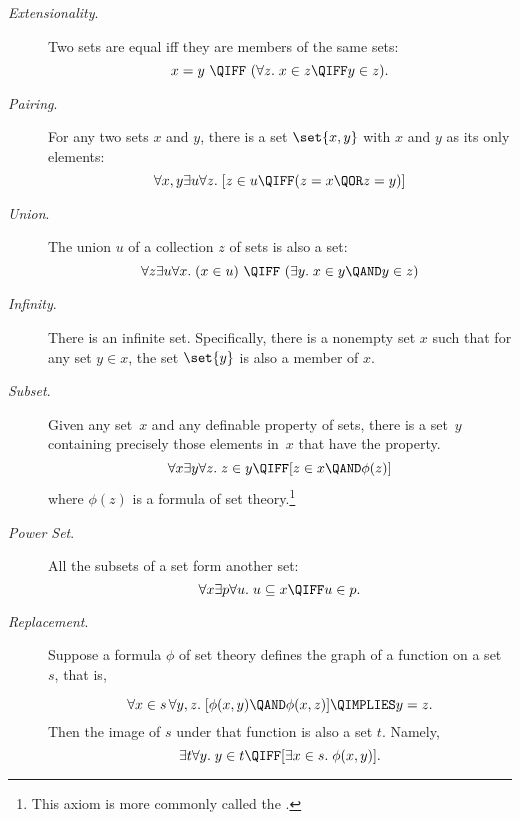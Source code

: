 \begin{description}

\item[\emph{Extensionality}.]  Two sets are equal iff
  they are members of the same sets:
\[
x = y\ \QIFF\ (\forall z.\; x \in z \QIFF y \in z).
\]

\item[\emph{Pairing}.] For
  any two sets $x$ and $y$, there is a set $\set{x,y}$ with $x$ and
  $y$ as its only elements:
\[
\forall x,y \exists u \forall z.\;
[z \in u \QIFF (z = x \QOR z = y)]
\]

\item[\emph{Union}.]  The union
  $u$ of a collection $z$ of sets is also a set:
\[
\forall z \exists u \forall x.\;
  (x \in u)\ \QIFF\ (\exists y.\; x \in y \QAND y \in z) 
\]

\item[\emph{Infinity}.]  There
  is an infinite set.  Specifically, there is a nonempty set $x$
  such that for any set $y \in x$, the set $\set{y}$ is also a member
  of $x$.

\item[\emph{Subset}.] Given any set~$x$ and any
  definable property of sets, there is a set~$y$ containing precisely
  those elements in~$x$ that have the property.
\[
\forall x \exists y \forall z.\; z \in y \QIFF [z \in x \QAND \phi(z)]
\]
where $\phi(z)$ is a formula of set theory.\footnote{This axiom is more commonly called
    the .}

\item[\emph{Power Set}.]  All the
  subsets of a set form another set:
\[
\forall x \exists p \forall u.\; u \subseteq x \QIFF u \in p.
\]

\item[\emph{Replacement}.]
  Suppose a formula $\phi$ of set theory defines the graph of a
  function on a set $s$, that is,
\iffalse
\[
\forall x \in s\, \exists y.\; \phi(x,y),
\]
and
\fi

\[
\forall x \in s\, \forall y, z.\; [\phi(x,y) \QAND \phi(x,z)] \QIMPLIES y = z.
\]
Then the image of $s$ under that function is also a set $t$.  Namely,
\[
\exists t \forall y.\; y \in t \QIFF [\exists x\in s.\; \phi(x,y)].
\]


\end{description}
